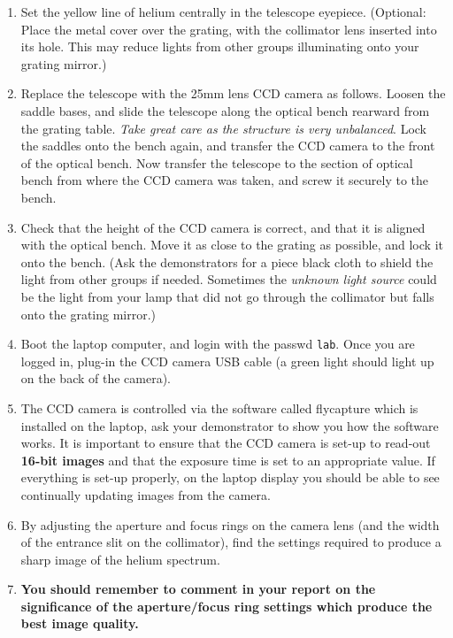 \documentclass[12pt]{article}
\begin{document}
\begin{enumerate}

\item Set the yellow line of helium centrally in the telescope eyepiece. (Optional: Place the metal cover over the grating, with the collimator lens inserted into its hole. This may reduce lights from other groups illuminating onto your grating mirror.)

\item Replace the telescope with the 25mm lens CCD camera as follows. Loosen the saddle bases, and slide the telescope along the optical bench rearward from the grating table. {\sl Take great care as the structure is very unbalanced}. Lock the saddles onto the bench again, and transfer the CCD camera to the front of the optical bench. Now transfer the telescope to the section of optical bench from where the CCD camera was taken, and screw it securely to the bench.

\item Check that the height of the CCD camera is correct, and that it is aligned with the optical bench. Move it as close to the grating as possible, and lock it onto the bench. (Ask the demonstrators for a piece black cloth to shield the light from other groups if needed. Sometimes the {\it unknown light source} could be the light from your lamp that did not go through the collimator but falls onto the grating mirror.)

\item Boot the laptop computer, and login with the passwd {\tt lab}. Once you are logged in, plug-in the CCD camera USB cable (a green light should light up on the back of the camera).

\item The CCD camera is controlled via the software called {\sc flycapture} which is installed on the laptop, ask your demonstrator to show you how the software works. It is important to ensure that the CCD camera is set-up to read-out {\bf 16-bit images} and that the exposure time is set to an appropriate value. If everything is set-up properly, on the laptop display you should be able to see continually updating images from the camera. 

\item By adjusting the aperture and focus rings on the camera lens (and the width of the entrance slit on the collimator), find the settings required to produce a sharp image of the helium spectrum.

\item {\bf You should remember to comment in your report on the significance of the aperture/focus ring settings which produce the best image quality.}

\end{enumerate}
\end{document}
